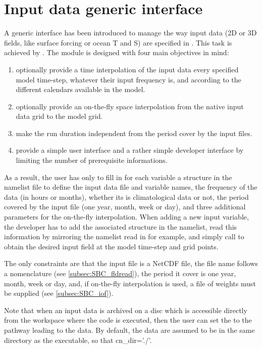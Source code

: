 \documentclass[../main/NEMO_manual]{subfiles}
\begin{document}
\section{Input data generic interface}
\label{sec:SBC_input}

A generic interface has been introduced to manage the way input data
(2D or 3D fields, like surface forcing or ocean T and S) are specified in \NEMO.
This task is achieved by .
The module is designed with four main objectives in mind:
\begin{enumerate}
\item optionally provide a time interpolation of the input data every specified model time-step, whatever their input frequency is,
  and according to the different calendars available in the model.
\item optionally provide an on-the-fly space interpolation from the native input data grid to the model grid.
\item make the run duration independent from the period cover by the input files.
\item provide a simple user interface and a rather simple developer interface by
  limiting the number of prerequisite informations.
\end{enumerate}

As a result, the user has only to fill in for each variable a structure in the namelist file to
define the input data file and variable names, the frequency of the data (in hours or months),
whether its is climatological data or not, the period covered by the input file (one year, month, week or day),
and three additional parameters for the on-the-fly interpolation.
When adding a new input variable, the developer has to add the associated structure in the namelist,
read this information by mirroring the namelist read in  for example,
and simply call  to obtain the desired input field at the model time-step and grid points.

The only constraints are that the input file is a NetCDF file, the file name follows a nomenclature
(see \autoref{subsec:SBC_fldread}), the period it cover is one year, month, week or day, and,
if on-the-fly interpolation is used, a file of weights must be supplied (see \autoref{subsec:SBC_iof}).

Note that when an input data is archived on a disc which is accessible directly from the workspace where
the code is executed, then the user can set the  to the pathway leading to the data.
By default, the data are assumed to be in the same directory as the executable, so that cn\_dir='./'.
\end{document}
